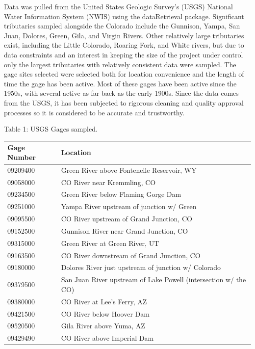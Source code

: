 \documentclass[
  12pt,
]{article}
\begin{document}
Data was pulled from the United States Geologic Survey's (USGS) National
Water Information System (NWIS) using the dataRetrieval package.
Significant tributaries sampled alongside the Colorado include the
Gunnison, Yampa, San Juan, Dolores, Green, Gila, and Virgin Rivers.
Other relatively large tributaries exist, including the Little Colorado,
Roaring Fork, and White rivers, but due to data constraints and an
interest in keeping the size of the project under control only the
largest tributaries with relatively consistent data were sampled. The
gage sites selected were selected both for location convenience and the
length of time the gage has been active. Most of these gages have been
active since the 1950s, with several active as far back as the early
1900s. Since the data comes from the USGS, it has been subjected to
rigorous cleaning and quality approval processes so it is considered to
be accurate and trustworthy.

Table 1: USGS Gages sampled.

\begin{longtable}[]{@{}ll@{}}
\toprule
Gage Number & Location \\
\midrule
\endhead
09209400 & Green River above Fontenelle Reservoir, WY \\
09058000 & CO River near Kremmling, CO \\
09234500 & Green River below Flaming Gorge Dam \\
09251000 & Yampa River upstream of junction w/ Green \\
09095500 & CO River upstream of Grand Junction, CO \\
09152500 & Gunnison River near Grand Junction, CO \\
09315000 & Green River at Green River, UT \\
09163500 & CO River downstream of Grand Junction, CO \\
09180000 & Dolores River just upstream of junction w/ Colorado \\
09379500 & San Juan River upstream of Lake Powell (intersection w/ the
CO) \\
09380000 & CO River at Lee's Ferry, AZ \\
09421500 & CO River below Hoover Dam \\
09520500 & Gila River above Yuma, AZ \\
09429490 & CO River above Imperial Dam \\
\bottomrule
\end{longtable}

\newpage
\end{document}
